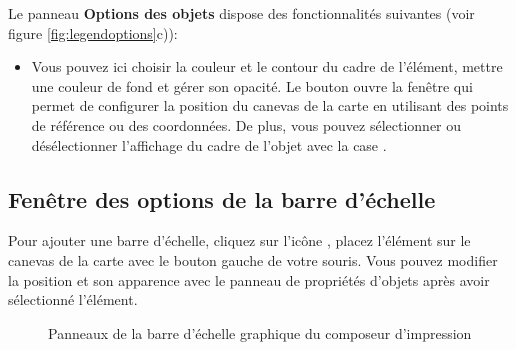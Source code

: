 
Le panneau \textbf{Options des objets} dispose des fonctionnalités suivantes (voir figure \ref{fig:legendoptions}c)):

\begin{itemize}[label=--]
\item Vous pouvez ici choisir la couleur et le contour du cadre de l'élément, mettre une couleur de fond et gérer son opacité. Le bouton  ouvre la fenêtre  qui permet de configurer la position du canevas de la carte en utilisant des points de référence ou des coordonnées. De plus, vous pouvez sélectionner ou désélectionner l'affichage du cadre de l'objet avec la case .
\end{itemize}

\subsection{Fenêtre des options de la barre d'échelle}

Pour ajouter une barre d'échelle, cliquez sur l'icône , placez l'élément sur le canevas de la carte avec le bouton gauche de votre souris. Vous pouvez modifier la position et son apparence avec le panneau de propriétés d'objets après avoir sélectionné l'élément.

\begin{figure}[ht]
\centering
{}
\hspace{1cm}
\caption{Panneaux de la barre d'échelle graphique du composeur d'impression \nixcaption}\label{fig:scalebaroptions}
\end{figure}

